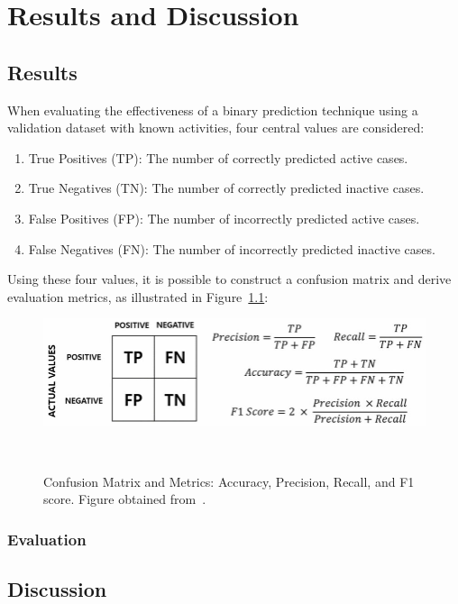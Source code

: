 \chapter{Results and Discussion}\label{chap:results_discussion}
\section{Results}\label{sec:results}
When evaluating the effectiveness of a binary prediction technique using a validation dataset with known activities, four central values are considered:

\begin{enumerate}
  \item True Positives (TP): The number of correctly predicted active cases.
  \item True Negatives (TN): The number of correctly predicted inactive cases.
  \item False Positives (FP): The number of incorrectly predicted active cases.
  \item False Negatives (FN): The number of incorrectly predicted inactive cases.
\end{enumerate}

Using these four values, it is possible to construct a confusion matrix and derive evaluation metrics, as illustrated in Figure~\ref{fig:confusion_matrix}:


\begin{figure} 
  \centering
  \includegraphics[width=1.0\textwidth]{figures/confusion_matrix_metrics.png}
  \caption{Confusion Matrix and Metrics: Accuracy, Precision, Recall, and F1 score.
  Figure obtained from~\cite{seol2023}.}
~\label{fig:confusion_matrix}
\end{figure}
\subsection{Evaluation}\label{sec:evaluation}
\section{Discussion}\label{sec:discussion}


